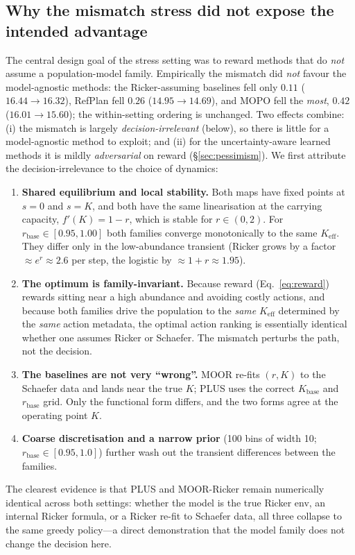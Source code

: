 \documentclass[11pt]{article}
\newcommand{\Keff}{K_{\mathrm{eff}}}
\newcommand{\rbase}{r_{\mathrm{base}}}
\begin{document}
\subsection{Why the mismatch stress did not expose the intended advantage}
The central design goal of the stress setting was to reward methods that do
\emph{not} assume a population-model family. Empirically the mismatch did
\emph{not} favour the model-agnostic methods: the Ricker-assuming baselines fell
only $0.11$ ($16.44 \to 16.32$), RefPlan fell $0.26$ ($14.95 \to 14.69$), and MOPO
fell the \emph{most}, $0.42$ ($16.01 \to 15.60$); the within-setting ordering is
unchanged. Two effects combine: (i) the mismatch is largely
\emph{decision-irrelevant} (below), so there is little for a model-agnostic method
to exploit; and (ii) for the uncertainty-aware learned methods it is mildly
\emph{adversarial} on reward (\S\ref{sec:pessimism}). We first attribute the
decision-irrelevance to the choice of dynamics:
\begin{enumerate}
  \item \textbf{Shared equilibrium and local stability.} Both maps have fixed
  points at $s=0$ and $s=K$, and both have the same linearisation at the carrying
  capacity, $f'(K) = 1 - r$, which is stable for $r \in (0,2)$. For
  $\rbase \in [0.95, 1.00]$ both families converge monotonically to the same
  $\Keff$. They differ only in the low-abundance transient (Ricker grows by a
  factor $\approx e^{r}\!\approx\!2.6$ per step, the logistic by
  $\approx 1+r\!\approx\!1.95$).
  \item \textbf{The optimum is family-invariant.} Because reward
  (Eq.~\ref{eq:reward}) rewards sitting near a high abundance and avoiding costly
  actions, and because both families drive the population to the \emph{same}
  $\Keff$ determined by the \emph{same} action metadata, the optimal action
  ranking is essentially identical whether one assumes Ricker or Schaefer. The
  mismatch perturbs the path, not the decision.
  \item \textbf{The baselines are not very ``wrong''.} MOOR re-fits $(r,K)$ to the
  Schaefer data and lands near the true $K$; PLUS uses the correct $K_{\mathrm{base}}$
  and $\rbase$ grid. Only the functional form differs, and the two forms agree at
  the operating point $K$.
  \item \textbf{Coarse discretisation and a narrow prior} (100 bins of width 10;
  $\rbase \in [0.95,1.0]$) further wash out the transient differences between the
  families.
\end{enumerate}
The clearest evidence is that PLUS and MOOR-Ricker remain numerically identical
across both settings: whether the model is the true Ricker env, an internal Ricker
formula, or a Ricker re-fit to Schaefer data, all three collapse to the same
greedy policy---a direct demonstration that the model family does not change the
decision here.
\end{document}
